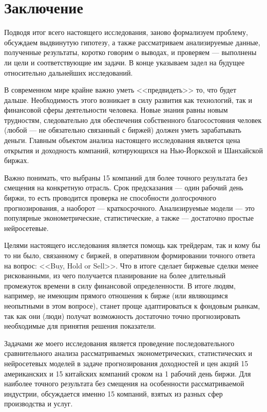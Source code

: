 \section{Заключение}
Подводя итог всего настоящего исследования, заново формализуем проблему, обсуждаем выдвинутую гипотезу, а также рассматриваем анализируемые данные, полученные результаты, коротко говорим о выводах, и проверяем --- выполнены ли цели и соответствующие им задачи. В конце указываем задел на будущее относительно дальнейших исследований.

В современном мире крайне важно уметь <<предвидеть>> то, что будет дальше. Необходимость этого возникает в силу развития как технологий, так и финансовой сферы деятельности человека. Новые знания равны новым трудностям, следовательно для обеспечения собственного благосостояния человек (любой --- не обязательно связанный с биржей) должен уметь зарабатывать деньги. Главным объектом анализа настоящего исследования является цена открытия и доходность компаний, котирующихся на Нью-Йоркской и Шанхайской биржах.

Важно понимать, что выбраны 15 компаний для более точного результата без смещения на конкретную отрасль. Срок предсказания --- один рабочий день биржи, то есть проводится проверка не способности долгосрочного прогнозирования, а наоборот --- краткосрочного. Анализируемые модели --- это популярные эконометрические, статистические, а также --- достаточно простые нейросетевые.

Целями настоящего исследования является помощь как трейдерам, так и кому бы то ни было, связанному с биржей, в оперативном формировании точного ответа на вопрос: <<Buy, Hold or Sell>>. Что в итоге сделает биржевые сделки менее рискованными, из чего получается планирование на более длительный промежуток времени в силу финансовой определенности. В итоге людям, например, не имеющим прямого отношения к бирже (или являющимся неопытными в этом вопросе), станет проще адаптироваться к фондовым рынкам, так как они (люди) получат возможность достаточно точно прогнозировать необходимые для принятия решения показатели.

Задачами же моего исследования является проведение последовательного сравнительного анализа рассматриваемых эконометрических, статистических и нейросетевых моделей в задаче прогнозирования доходностей и цен акций 15 американских и 15 китайских компаний сроком на 1 рабочий день биржи. Для наиболее точного результата без смещения на особенности рассматриваемой индустрии, обсуждается именно 15 компаний, взятых из разных сфер производства и услуг.

